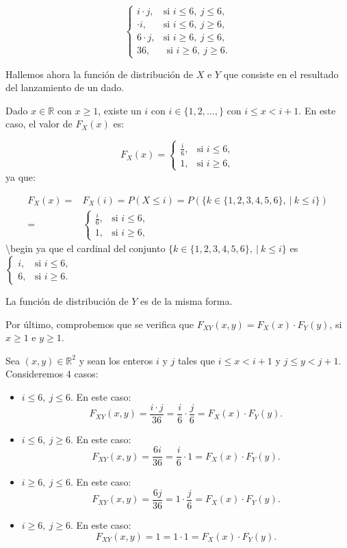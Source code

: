 \documentclass[
  letterpaper,
  DIV=11,
  numbers=noendperiod]{scrreprt}
\begin{document}
\[
\begin{cases}
i\cdot j, & \mbox{si }i\leq 6, \ j\leq 6, \\
\cdot  i, & \mbox{si }i\leq 6,\ j\geq 6,\\
6\cdot j, & \mbox{si }i\geq 6,\ j\leq 6,\\
36, & \mbox{ si }i\geq 6,\ j\geq 6.
\end{cases}
\]

Hallemos ahora la función de distribución de \(X\) e \(Y\) que consiste
en el resultado del lanzamiento de un dado.

Dado \(x\in\mathbb{R}\) con \(x\geq 1\), existe un \(i\) con
\(i\in\{1,2,\ldots,\}\) con \(i\leq x <i+1\). En este caso, el valor de
\(F_X(x)\) es:

\[
F_X(x)=\begin{cases}
\frac{i}{6}, &\mbox{si }i\leq 6,\\
1, & \mbox{si }i\geq 6,
\end{cases}
\] ya que:

\[
\begin{array}{rl}
F_X(x) = & F_X(i)=P(X\leq i)=P(\{k\in\{1,2,3,4,5,6\},\ |\ k\leq i\})
\\ = & 
\begin{cases}
\frac{i}{6}, &\mbox{si }i\leq 6,\\
1, & \mbox{si }i\geq 6,
\end{cases}
\end{array}
\] \textbackslash begin ya que el cardinal del conjunto
\(\{k\in\{1,2,3,4,5,6\},\ |\ k\leq i\}\) es
\(\begin{cases} i, &\mbox{si }i\leq 6,\\ 6, & \mbox{si }i\geq 6. \end{cases}\)

La función de distribución de \(Y\) es de la misma forma.

Por último, comprobemos que se verifica que
\(F_{XY}(x,y)=F_X(x)\cdot F_Y(y)\), si \(x\geq 1\) e \(y\geq 1\).

Sea \((x,y)\in\mathbb{R}^2\) y sean los enteros \(i\) y \(j\) tales que
\(i\leq x<i+1\) y \(j\leq y<j+1\). Consideremos 4 casos:

\begin{itemize}
\item
  \(i\leq 6, \ j\leq 6\). En este caso: \[
  F_{XY}(x,y)=\frac{i\cdot j}{36}=\frac{i}{6}\cdot \frac{j}{6}=F_X(x)\cdot F_Y(y).
  \]
\item
  \(i\leq 6,\ j\geq 6\). En este caso: \[
  F_{XY}(x,y)=\frac{6i}{36}=\frac{i}{6}\cdot 1=F_X(x)\cdot F_Y(y).
  \]
\item
  \(i\geq 6,\ j\leq 6\). En este caso: \[
  F_{XY}(x,y)=\frac{6j}{36}=1\cdot \frac{j}{6}=F_X(x)\cdot F_Y(y).
  \]
\item
  \(i\geq 6,\ j\geq 6\). En este caso: \[
  F_{XY}(x,y)=1=1\cdot 1=F_X(x)\cdot F_Y(y).
  \]
\end{itemize}
\end{document}
